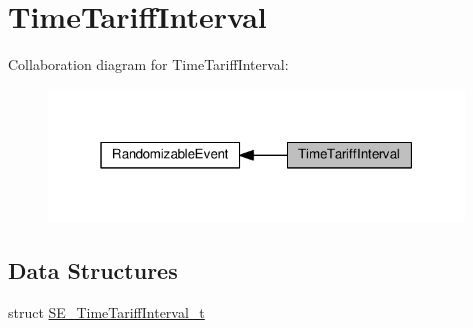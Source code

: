 \hypertarget{group__TimeTariffInterval}{}\section{Time\+Tariff\+Interval}
\label{group__TimeTariffInterval}
Collaboration diagram for Time\+Tariff\+Interval\+:\nopagebreak
\begin{figure}[H]
\begin{center}
\leavevmode
\includegraphics[width=313pt]{group__TimeTariffInterval}
\end{center}
\end{figure}
\subsection*{Data Structures}
\begin{DoxyCompactItemize}
\item 
struct \hyperlink{structSE__TimeTariffInterval__t}{S\+E\+\_\+\+Time\+Tariff\+Interval\+\_\+t}
\end{DoxyCompactItemize}
